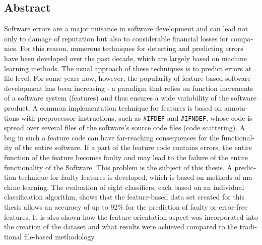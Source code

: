 \begin{otherlanguage}{english}
    \section*{Abstract}
    
Software errors are a major nuisance in software development and can lead not only to damage of reputation but also to considerable financial losses for companies. For this reason, numerous techniques for detecting and predicting errors have been developed over the past decade, which are largely based on machine learning methods. The usual approach of these techniques is to predict errors at file level. For some years now, however, the popularity of feature-based software development has been increasing - a paradigm that relies on function increments of a software system (features) and thus ensures a wide variability of the software product. A common implementation technique for features is based on annotations with preprocessor instructions, such as \texttt{\#IFDEF} and \texttt{\#IFNDEF}, whose code is spread over several files of the software's source code files (\glqq code scattering\grqq). A bug in such a feature code can have far-reaching consequences for the functionality of the entire software. If a part of the feature code contains errors, the entire function of the feature becomes faulty and may lead to the failure of the entire functionality of the Software. This problem is the subject of this thesis. A prediction technique for faulty features is developed, which is based on methods of machine learning. The evaluation of eight classifiers, each based on an individual classification algorithm, shows that the feature-based data set created for this thesis allows an accuracy of up to 92\% for the prediction of faulty or error-free features. It is also shown how the feature orientation aspect was incorporated into the creation of the dataset and what results were achieved compared to the traditional file-based methodology.

\end{otherlanguage}
\cleardoublepage
